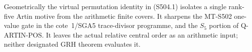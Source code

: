 Geometrically the virtual permutation identity in
(S504.1) isolates a single rank-five Artin motive from
the arithmetic finite covers. It sharpens the
MT-S502 one-value gate in the cote~1/SGA5 trace-divisor
programme, and the $S_5$ portion of Q-ARTIN-POS.
It leaves the actual relative central order as an
arithmetic input; neither designated GRH theorem
evaluates it.
